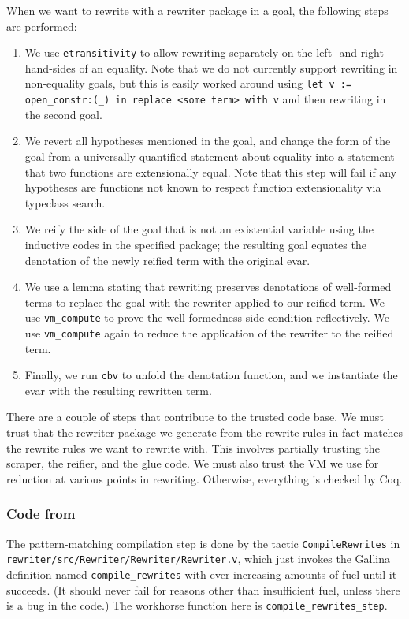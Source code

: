 \documentclass[a4paper,USenglish,cleveref,autoref,thm-restate]{lipics-v2021}
\newcommand{\tacvmcompute}{\texttt{vm_compute}}
\newcommand{\taccbv}{\texttt{cbv}}
\begin{document}
\begin{minipage}[t][1cm]{\textwidth}
When we want to rewrite with a rewriter package in a goal, the following steps are performed:
\begin{enumerate}
    \item
    We use \texttt{etransitivity} to allow rewriting separately on the left- and right-hand-sides of an equality.
    Note that we do not currently support rewriting in non-equality goals, but this is easily worked around using \texttt{let v := open\_constr:(\_) in replace <some term> with v} and then rewriting in the second goal.
    \item
    We revert all hypotheses mentioned in the goal, and change the form of the goal from a universally quantified statement about equality into a statement that two functions are extensionally equal.
    Note that this step will fail if any hypotheses are functions not known to respect function extensionality via typeclass search.
    \item
    We reify the side of the goal that is not an existential variable using the inductive codes in the specified package; the resulting goal equates the denotation of the newly reified term with the original evar.
    \item
    We use a lemma stating that rewriting preserves denotations of well-formed terms to replace the goal with the rewriter applied to our reified term.
    We use \tacvmcompute{} to prove the well-formedness side condition reflectively.
    We use \tacvmcompute{} again to reduce the application of the rewriter to the reified term.
    \item
    Finally, we run \taccbv{} to unfold the denotation function, and we instantiate the evar with the resulting rewritten term.
\end{enumerate}

There are a couple of steps that contribute to the trusted code base.
We must trust that the rewriter package we generate from the rewrite rules in fact matches the rewrite rules we want to rewrite with.
This involves partially trusting the scraper, the reifier, and the glue code.
We must also trust the VM we use for reduction at various points in rewriting.
Otherwise, everything is checked by Coq.

\subsubsection{Code from }

The pattern-matching compilation step is done by the tactic \texttt{CompileRewrites} in \texttt{rewriter/src/Rewriter/Rewriter/Rewriter.v}, which just invokes the Gallina definition named \texttt{compile\_rewrites} with ever-increasing amounts of fuel until it succeeds.
(It should never fail for reasons other than insufficient fuel, unless there is a bug in the code.)
The workhorse function here is \texttt{compile\_rewrites\_step}.


\end{minipage}
\end{document}
